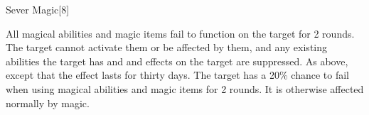 \begin{spellsection}{Sever Magic}[8]
    \begin{spellheader}
    \end{spellheader}
    \begin{spellcontent}
        \begin{spelltargetinginfo}
        \end{spelltargetinginfo}
        \begin{spelleffects}
            \begin{spellattack}
                \spellsuccess All magical abilities and magic items fail to function on the target for 2 rounds. The target cannot activate them or be affected by them, and any existing abilities the target has and and effects on the target are suppressed.
                \spellcritical As above, except that the effect lasts for thirty days.
                \spellfailure The target has a 20\% chance to fail when using magical abilities and magic items for 2 rounds. It is otherwise affected normally by magic.
            \end{spellattack}
        \end{spelleffects}
    \end{spellcontent}
    \begin{spellfooter}
        \miscastexplode
    \end{spellfooter}
\end{spellsection}

